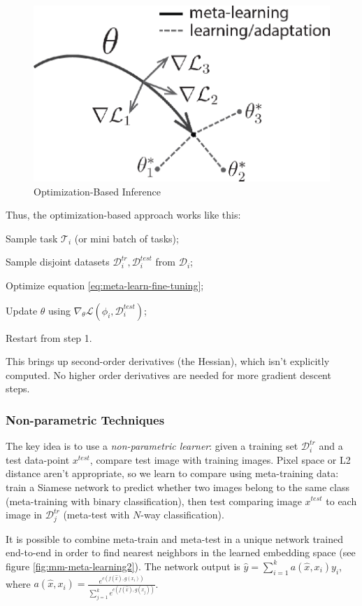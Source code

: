 \begin{figure}[h!]
    \centering
    \includegraphics[width=0.4\linewidth]{images/mm-meta-learning1}
    \caption[Optimization-Based Inference]{Optimization-Based Inference}
    \label{fig:mm-meta-learning1}
\end{figure}

Thus, the optimization-based approach works like this:
\begin{myenum}
    \item Sample task $\mathcal{T}_i$ (or mini batch of tasks);
    \item Sample disjoint datasets $\mathcal{D}_i^{tr}, \mathcal{D}_i^{test}$ from $\mathcal{D}_i$;
    \item Optimize equation \ref{eq:meta-learn-fine-tuning};
    \item Update $\theta$ using $\nabla_\theta \mathcal{L}\left(\phi_i, \mathcal{D}_i^{test} \right)$;
    \item Restart from step 1.
\end{myenum}
This brings up second-order derivatives (the Hessian), which isn't explicitly computed. No higher order derivatives are needed for more gradient descent steps.


\subsubsection{Non-parametric Techniques}\label{sec:mm-non-parametric}

The key idea is to use a \textit{non-parametric learner}: given a training set $\mathcal{D}_i^{tr}$ and a test data-point $x^{test}$, compare test image with training images. Pixel space or L2 distance aren't appropriate, so we learn to compare using meta-training data: train a Siamese network to predict whether two images belong to the same class (meta-training with binary classification), then test comparing image $x^{test}$ to each image in $\mathcal{D}_j^{tr}$ (meta-test with $N$-way classification).

It is possible to combine meta-train and meta-test in a unique network trained end-to-end in order to find nearest neighbors in the learned embedding space (see figure \ref{fig:mm-meta-learning2}). The network output is $\hat{y} = \sum_{i=1}^{k} a(\hat{x}, x_i)y_i$, where $a(\hat{x}, x_i) = \frac{e^{c(f(\hat{x}), g(x_i))}}{\sum_{j=1}^k e^{c(f(\hat{x}), g(x_j))}}$.

